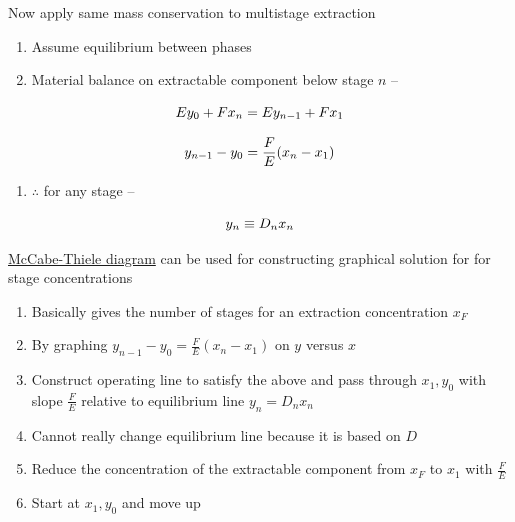 \documentclass[aspectratio=1610,pdftex,dvipsnames,compress,xcolor={dvipsnames}]{beamer}
\begin{document}
\begin{frame}{Now apply same mass conservation to multistage extraction}
    \begin{enumerate}[topsep=0pt,itemsep=21pt,leftmargin=*,label=(\arabic*)]
        \item[]Assume equilibrium between phases
        \item[]Material balance on extractable component below stage $n$ --
    \end{enumerate}

    \vspace*{\fill}

    \begin{equation}
        \LARGE
        Ey_0 + Fx_n = Ey_{n-1} + Fx_1
    \end{equation}

    \begin{equation}
        \LARGE
        y_{n-1} - y_0 = \frac{F}{E}(x_n-x_1)
    \end{equation}
    
    \vspace*{\fill}

    \begin{enumerate}[topsep=0pt,itemsep=18pt,leftmargin=*,label=(\arabic*)]
        \item[]$\therefore$ for any stage -- 
    \end{enumerate}

    \vspace*{\fill}

    \begin{equation}
        \LARGE
        y_n \equiv D_nx_n
    \end{equation}
\end{frame}


\begin{frame}{\href{http://ljs.academicdirect.org/A20/079_094.pdf}{McCabe-Thiele diagram} can be used for constructing graphical solution for for stage concentrations}
    \begin{enumerate}[topsep=0pt,itemsep=21pt,leftmargin=*,label=(\arabic*)]
        \item[]Basically gives the number of stages for an extraction concentration $x_F$
        \item[]By graphing $y_{n-1} - y_0 = \frac{F}{E}(x_n-x_1)$ on $y$ versus $x$
        \item[]Construct operating line to satisfy the above and pass through $x_1,y_0$ with slope $\frac{F}{E}$ relative to equilibrium line $y_n = D_nx_n$
        \item[]Cannot really change equilibrium line because it is based on $D$
        \item[]Reduce the concentration of the extractable component from $x_F$ to $x_1$ with $\frac{F}{E}$
        \item[]Start at $x_1,y_0$ and move up
    \end{enumerate}
\end{frame}
\end{document}
